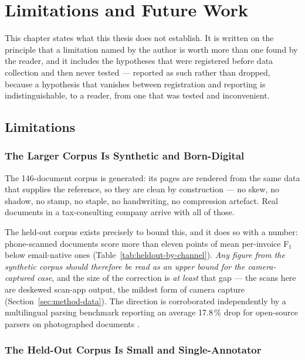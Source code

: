 \chapter{Limitations and Future Work}
\label{ch:limitations-future-work}

This chapter states what this thesis does not establish. It is written on the principle that a
limitation named by the author is worth more than one found by the reader, and it includes the
hypotheses that were registered before data collection and then never tested --- reported as
such rather than dropped, because a hypothesis that vanishes between registration and reporting
is indistinguishable, to a reader, from one that was tested and inconvenient.

\section{Limitations}
\label{sec:limitations}

\subsection{The Larger Corpus Is Synthetic and Born-Digital}
\label{sec:lim-corpus}

The 146-document corpus is generated: its pages are rendered from the same data that supplies
the reference, so they are clean by construction --- no skew, no shadow, no stamp, no staple, no
handwriting, no compression artefact. Real documents in a tax-consulting company arrive with all of those.

The held-out corpus exists precisely to bound this, and it does so with a number:
phone-scanned documents score more than eleven points of mean per-invoice F$_1$ below
email-native ones (Table~\ref{tab:heldout-by-channel}). \emph{Any figure from the synthetic
corpus should therefore be read as an upper bound for the camera-captured case}, and the size of
the correction is \emph{at least} that gap --- the scans here are deskewed scan-app output, the
mildest form of camera capture (Section~\ref{sec:method-data}). The direction is corroborated
independently by a multilingual parsing benchmark reporting an average 17.8\,\% drop for
open-source parsers on photographed documents \parencite{mdpbench2026}.

\subsection{The Held-Out Corpus Is Small and Single-Annotator}
\label{sec:lim-heldout}

